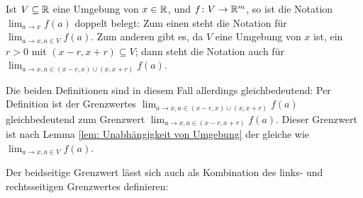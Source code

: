 \documentclass[a4paper,10pt]{article}
\begin{document}
\begin{bem}
 Ist $V \subseteq \mathbb{R}$ eine Umgebung von $x \in \mathbb{R}$, und $f \colon V \to \mathbb{R}^m$, so ist die Notation $\lim_{a \to x} f(a)$ doppelt belegt: Zum einen steht die Notation für $\lim_{a \to x, a \in V} f(a)$. Zum anderen gibt es, da $V$ eine Umgebung von $x$ ist, ein $r > 0$ mit $(x-r,x+r) \subseteq V$; dann steht die Notation auch für $\lim_{a \to x, a \in (x-r,x) \cup (x,x+r)} f(a)$.
 
 Die beiden Definitionen sind in diesem Fall allerdings gleichbedeutend: Per Definition ist der Grenzwertes $\lim_{a \to x, a \in (x-r,x) \cup (x,x+r)} f(a)$ gleichbedeutend zum Grenzwert $\lim_{a \to x, a \in (x-r,x+r)} f(a)$. Dieser Grenzwert ist nach Lemma \ref{lem: Unabhängigkeit von Umgebung} der gleiche wie $\lim_{a \to x, a \in V} f(a)$.
\end{bem}


Der beidseitige Grenzwert lässt sich auch als Kombination des links- und rechtsseitigen Grenzwertes definieren:
\end{document}
